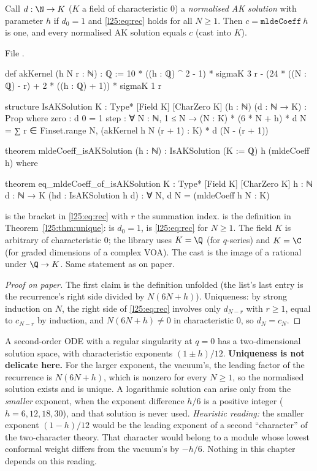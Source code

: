 \begin{theorem}\label{l25:thm:unique}
Call $d:\N\to K$ ($K$ a field of characteristic $0$) a \emph{normalised AK solution} with parameter $h$ if $d_0=1$
and \eqref{l25:eq:rec} holds for all $N\ge1$. Then $c=\mathtt{mldeCoeff}\ h$ is one, and every normalised AK
solution equals $c$ (cast into $K$).
\end{theorem}
\noindent File .
\begin{leancode}
def akKernel (h N r : ℕ) : ℚ :=
  10 * ((h : ℚ) ^ 2 - 1) * sigmaK 3 r - (24 * ((N : ℚ) - r) + 2 * ((h : ℚ) + 1)) * sigmaK 1 r

structure IsAKSolution {K : Type*} [Field K] [CharZero K] (h : ℕ) (d : ℕ → K) : Prop where
  zero : d 0 = 1
  step : ∀ N : ℕ, 1 ≤ N →
    (N : K) * (6 * N + h) * d N
      = ∑ r ∈ Finset.range N, (akKernel h N (r + 1) : K) * d (N - (r + 1))

theorem mldeCoeff_isAKSolution (h : ℕ) : IsAKSolution (K := ℚ) h (mldeCoeff h) where

theorem eq_mldeCoeff_of_isAKSolution {K : Type*} [Field K] [CharZero K] {h : ℕ} {d : ℕ → K}
    (hd : IsAKSolution h d) : ∀ N, d N = (mldeCoeff h N : K)
\end{leancode}
\begin{dictionary}
 is the bracket in \eqref{l25:eq:rec} with $r$ the summation index.  is the
definition in Theorem~\ref{l25:thm:unique}:  is $d_0=1$,  is \eqref{l25:eq:rec} for $N\ge1$. The
field $K$ is arbitrary of characteristic $0$; the library uses $K=\Q$ (for $q$-series) and $K=\C$ (for graded
dimensions of a complex VOA). The cast  is the image of a rational under $\Q\to K$.
Same statement as on paper.
\end{dictionary}
\begin{proof}[Proof on paper]
The first claim is the definition unfolded (the list's last entry is the recurrence's right side divided by
$N(6N+h)$). Uniqueness: by strong induction on $N$, the right side of \eqref{l25:eq:rec} involves only $d_{N-r}$ with
$r\ge1$, equal to $c_{N-r}$ by induction, and $N(6N+h)\ne0$ in characteristic $0$, so $d_N=c_N$.
\end{proof}
\begin{physics}
A second-order ODE with a regular singularity at $q=0$ has a two-dimensional solution space, with characteristic
exponents $(1\pm h)/12$. \textbf{Uniqueness is not delicate here.} For the larger exponent, the vacuum's, the leading
factor of the recurrence is $N(6N+h)$, which is nonzero for every $N\ge1$, so the normalised solution exists and is
unique. A logarithmic solution can arise only from the \emph{smaller} exponent, when the exponent difference $h/6$ is a
positive integer ($h=6,12,18,30$), and that solution is never used. \emph{Heuristic reading:} the smaller exponent
$(1-h)/12$ would be the leading exponent of a second ``character'' of the two-character theory. That character would
belong to a module whose lowest conformal weight differs from the vacuum's by $-h/6$. Nothing in this chapter depends on
this reading.
\end{physics}
